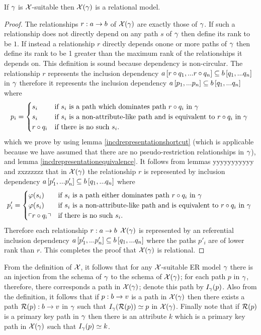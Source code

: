 \begin{lemma}
If $\gamma$ is $\mathcal{X}$-suitable then $\mathcal{X}(\gamma)$ is a relational model.
\end{lemma}
\begin{proof}
The relationships $r: a \rightarrow b$ of $\mathcal{X}(\gamma)$ are exactly those of $\gamma$. If such a relationship does not directly depend on any path $s$ of $\gamma$ then define its rank to be $1$.
If instead a relationship $r$ directly depends onone or more paths of $\gamma$ then define its rank to be 1 greater than the maximum rank of the relationships it depends on. 
This definition is sound because dependency is non-circular.
The relationship $r$ represents the inclusion dependency $a\left[r \circ q_1,...r \circ q_n\right]\subseteq b\left[q_1,...q_n\right]$ in $\gamma$ therefore it represents
the inclusion dependency $a\left[p_1,...p_n\right]\subseteq b\left[q_1,...q_n\right]$ where 
$$
p_i =
\begin{cases} 
    s_i         & \mbox{if $s_i$ is a path which dominates path $r \circ q_i$ in $\gamma$} \\
    s_i         & \mbox{if $s_i$ is a non-attribute-like path and is equivalent to  $r \circ q_i$ in $\gamma$ }  \\
    r \circ q_i & \mbox{if there is no such $s_i$.}
\end{cases} 
$$
which we prove by using lemma \ref{incdrepresentationshortcut} (which is applicable because we have assumed 
that there are no pseudo-restriction relationships in $\gamma$), and lemma \ref{incdrepresentationequivalence}.
It follows from lemmas yyyyyyyyyyy  and zxzzzzzz that in $\mathcal{X}(\gamma)$ the relationship $r$ is represented by inclusion dependency $a\left[p'_1,...p'_n\right]\subseteq b\left[q_1,...q_n\right]$ where
$$
p'_i =
\begin{cases}
   \varphi(s_i)     & \mbox{if $s_i$ is a path  either dominates path $r \circ q_i$ in $\gamma$} \\
   \varphi(s_i)     & \mbox{if $s_i$ is a non-attribute-like path and is equivalent to  $r \circ q_i$ in $\gamma$ }  \\
   \left\ulcorner r \circ q_i\right\urcorner  & \mbox{if there is no such $s_i$.}
\end{cases} 
$$
Therefore each relationship $r: a \rightarrow b$ $\mathcal{X}(\gamma)$ is represented by an referential inclusion dependency $a\left[p'_1,...p'_n\right]\subseteq b\left[q_1,...q_n\right]$
where the paths $p'_i$ are of lower rank than $r$. This completes the proof that $\mathcal{X}(\gamma)$ is relational.
\end{proof}


From the definition of $\mathcal{X}$, it follows that for any $\mathcal{X}$-suitable ER model $\gamma$ there is an injection from the schema of $\gamma$ to the schema of $\mathcal{X}(\gamma)$; for each path $p$ in $\gamma$, therefore, there corresponds a path 
in $\mathcal{X}(\gamma)$; denote this path by  $I_\gamma(p)$. Also from the definition, it follows that
if $p:b \rightarrow v$ is a path in $\mathcal{X}(\gamma)$ then there exists a path $\mathcal{R}(p):b \rightarrow v$ in $\gamma$ such that $I_\gamma(\mathcal{R}(p)) \simeq p$ in $\mathcal{X}(\gamma)$. Finally note that if $\mathcal{R}(p)$ is a primary key path in $\gamma$ then there is an attribute $k$ which is a primary key path
in $\mathcal{X}(\gamma)$ such that $I_\gamma(p) \simeq k$. 


